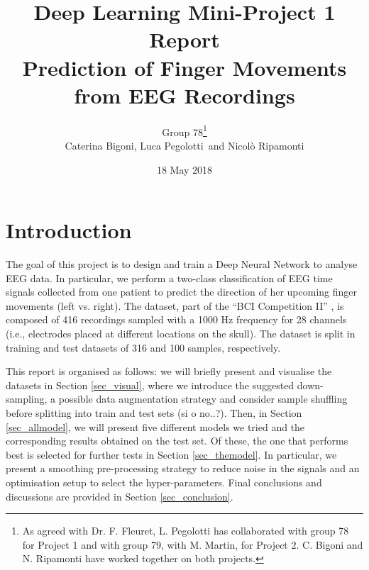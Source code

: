 \documentclass{article}
\begin{document}
\title{Deep Learning Mini-Project 1 Report \\ Prediction of Finger Movements from EEG Recordings}

\author{Group 78\footnote{As agreed with Dr. F. Fleuret, L. Pegolotti has collaborated with group 78 for Project 1 and with group 79, with M. Martin, for Project 2. C. Bigoni and N. Ripamonti have worked together on both projects.}\\ Caterina Bigoni, Luca Pegolotti \,and Nicol\`o Ripamonti}
\date{18 May 2018}
\maketitle





\section{Introduction}
 The goal of this project is to design and train a Deep Neural Network to analyse EEG data. 
 In particular, we perform a two-class classification of EEG time signals collected from one patient to predict the direction of her upcoming finger movements (left vs. right). 
 The  dataset, part of the ``BCI Competition II'' \cite{bci_ii}, is composed of 416 recordings  sampled with a 1000 Hz frequency for 28 channels (i.e., electrodes placed at different locations on the skull).
The dataset is split in training and test datasets of 316 and 100 samples, respectively. 

This report is organised as follows: we will briefly present and visualise the datasets in Section \ref{sec_visual}, where we introduce the suggested down-sampling, a possible  data augmentation strategy and consider sample shuffling before splitting into train and test sets (si o no..?). 
Then, in Section \ref{sec_allmodel}, we will present five different models we tried and the corresponding results obtained on the test set.
Of these, the one that performs best is selected for further tests in Section \ref{sec_themodel}. 
In particular, we present a smoothing pre-processing strategy to reduce noise in the signals and  an optimisation setup to select the hyper-parameters.  
Final conclusions and discussions are provided in Section \ref{sec_conclusion}. 

\end{document}
